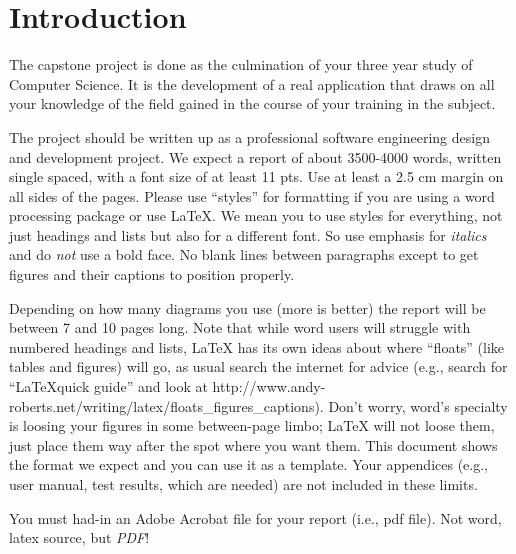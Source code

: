 \section{Introduction}
The capstone project is done as the culmination of your three year
study of Computer Science. It is the development of a real application
that draws on all your knowledge of the field gained in the course of
your training in the subject.

The project should be written up as a professional software
engineering design and development project. We expect a report of
about 3500-4000 words, written single spaced, with a font size of at
least 11 pts. Use at least a 2.5 cm margin on all sides of the
pages. Please use ``styles'' for formatting if you are using a word
processing package or use \LaTeX. We mean you to use styles for
everything, not just headings and lists but also for a different
font. So use emphasis for \emph{italics} and do \emph{not} use a bold
face. No blank lines between paragraphs except to get figures and
their captions to position properly.

Depending on how many diagrams you use (more is better) the report
will be between 7 and 10 pages long. Note that while word users will
struggle with numbered headings and lists, \LaTeX\/ has its own ideas
about where ``floats'' (like tables and figures) will go, as usual
search the internet for advice (e.g., search for ``\LaTeX quick
guide'' and look at
http://www.andy-roberts.net/writing/latex/floats\_figures\_captions). Don't
worry, word's specialty is loosing your figures in some between-page
limbo; \LaTeX\/ will not loose them, just place them way after the
spot where you want them.  This document shows the format we expect
and you can use it as a template.  Your appendices (e.g., user manual,
test results, which are needed) are not included in these limits.

You must had-in an Adobe Acrobat file for your report (i.e., pdf
file). Not word, latex source, but \emph{PDF}!

